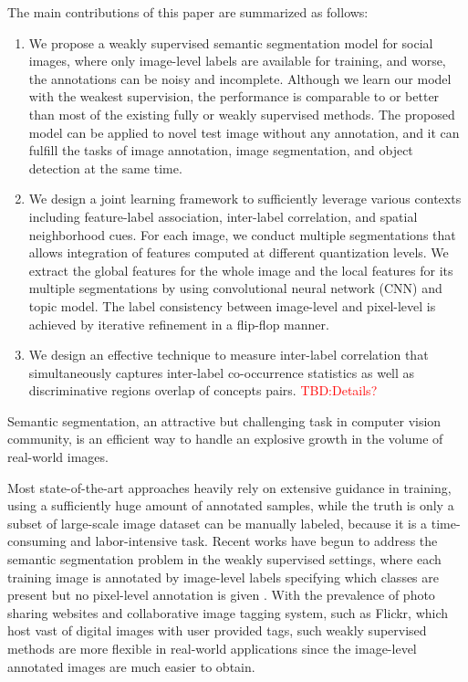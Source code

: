 The main contributions of this paper are summarized as follows:
\begin{enumerate}
  \item We propose a weakly supervised semantic segmentation model for social images, where only image-level labels are available for training, and worse, the annotations can be noisy and incomplete. Although we learn our model with the weakest supervision, the performance is comparable to or better than most of the existing fully or weakly supervised methods. The  proposed model can be applied to novel test image without any annotation, and it can fulfill the tasks of image annotation, image segmentation, and object detection at the same time.
  \item We design a joint learning framework to sufficiently leverage various contexts including  feature-label association, inter-label correlation, and spatial neighborhood cues. For each image, we conduct multiple segmentations that allows integration of features computed at different quantization levels.  We extract the global  features for the whole image and the local features for its multiple segmentations by using convolutional neural network (CNN) and topic model.  The label consistency between image-level and pixel-level is achieved by iterative refinement   in a flip-flop manner.
  \item We design an effective technique to measure inter-label correlation that simultaneously captures inter-label co-occurrence statistics as well as discriminative regions overlap of concepts pairs. {\textcolor{red}{TBD:Details?}}
\end{enumerate}

\if
Semantic segmentation, an attractive but challenging task in computer vision community, is an efficient way to handle an explosive growth in the volume of real-world images.


Most state-of-the-art approaches heavily rely on extensive guidance in training, using a sufficiently huge amount of annotated samples, while the truth is only a subset of large-scale image dataset can be manually labeled, because it is a time-consuming and labor-intensive task.
Recent works have begun to address the semantic segmentation problem in the weakly supervised settings, where each training image is annotated by image-level labels specifying which classes are present but no pixel-level annotation   is given \cite{verbeek2007region,vezhnevets2010towards,vezhnevets2011weakly,vezhnevets2012weakly,xu2014tell,zhang2013sparse,zhang2013probabilistic}. With the prevalence of photo sharing websites and collaborative image tagging system, such as Flickr, which host vast of digital images with user provided tags, such weakly supervised methods are more flexible in real-world applications since the image-level annotated images are much easier to obtain.

